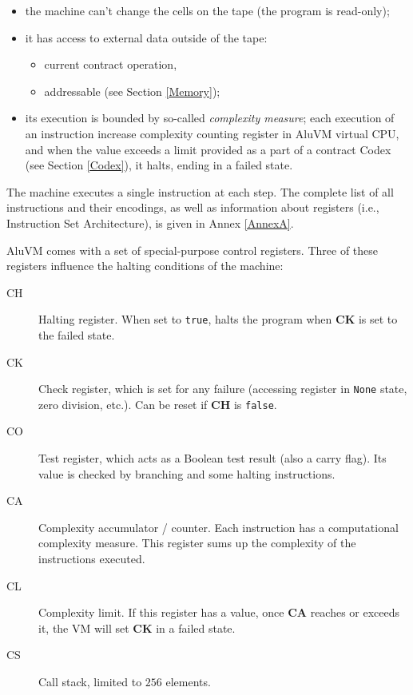 \documentclass[9pt,oneside]{amsart}
\begin{document}
\begin{multicols}{2}
\begin{itemize}
\item the machine can't change the cells on the tape (the program is read-only);
\item it has access to external data outside of the tape:
    \begin{itemize}
    \item current contract operation,
    \item addressable (see Section \ref{Memory});
    \end{itemize}
\item its execution is bounded by so-called \emph{complexity measure};
  each execution of an instruction increase complexity counting register in AluVM virtual CPU,
  and when the value exceeds a limit provided as a part of a contract Codex (see Section \ref{Codex}),
  it halts, ending in a failed state.
\end{itemize}

The machine executes a single instruction at each step.
The complete list of all instructions and their encodings,
as well as information about registers (i.e., Instruction Set Architecture),
is given in Annex \ref{AnnexA}.

AluVM comes with a set of special-purpose control registers.
Three of these registers influence the halting conditions of the machine:

\begin{description}
\item[CH] Halting register. When set to \texttt{true}, halts the program when \textbf{CK} is set to the failed state.
\item[CK] Check register, which is set for any failure (accessing register in \texttt{None} state,
        zero division, etc.). Can be reset if \textbf{CH} is \texttt{false}.
\item[CO] Test register, which acts as a Boolean test result (also a carry flag).
        Its value is checked by branching and some halting instructions.
\item[CA] Complexity accumulator / counter.
        Each instruction has a computational complexity measure.
        This register sums up the complexity of the instructions executed.
\item[CL] Complexity limit. If this register has a value, once \textbf{CA} reaches or exceeds it,
        the VM will set \textbf{CK} in a failed state.
\item[CS] Call stack, limited to $256$ elements.
\end{description}


\end{multicols}
\end{document}
